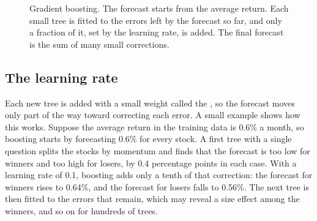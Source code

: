 \begin{figure}[htbp]
  \centering
  \caption{Gradient boosting. The forecast starts from the average return. Each
    small tree is fitted to the errors left by the forecast so far, and only a
    fraction of it, set by the learning rate, is added. The final forecast is
    the sum of many small corrections.}
  \label{fig:20-boosting}
\end{figure}

\subsection{The learning rate}

Each new tree is added with a small weight called the , so the forecast moves only part of the way toward correcting each error. A small example shows how this works. Suppose the average return in the training data is 0.6\% a month, so boosting starts by forecasting 0.6\% for every stock. A first tree with a single question splits the stocks by momentum and finds that the forecast is too low for winners and too high for losers, by 0.4 percentage points in each case. With a learning rate of 0.1, boosting adds only a tenth of that correction: the forecast for winners rises to 0.64\%, and the forecast for losers falls to 0.56\%. The next tree is then fitted to the errors that remain, which may reveal a size effect among the winners, and so on for hundreds of trees.

